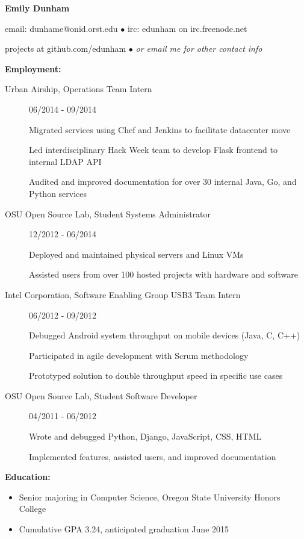 \documentclass[11pt]{article}
\begin{document}
\centerline{{\LARGE \bf Emily Dunham}}

\bigskip

\centerline{email: dunhame@onid.orst.edu
        $\bullet$
        irc: edunham on irc.freenode.net}
\centerline{projects at github.com/edunham
        $\bullet$
        \emph{or email me for other contact info}}

\bigskip
\hrulefill
\bigskip

{\Large \bf Employment:}
\begin{description}
\item[Urban Airship, Operations Team Intern]
    \hfill 06/2014 - 09/2014
    
    Migrated services using Chef and Jenkins to facilitate datacenter move

    Led interdisciplinary Hack Week team to develop Flask frontend to internal LDAP API

    Audited and improved documentation for over 30 internal Java, Go, and Python
    services

\item[OSU Open Source Lab, Student Systems Administrator]
    \hfill 12/2012 - 06/2014

    Deployed and maintained physical servers and Linux VMs

    Assisted users from over 100 hosted projects with hardware and software

\item[Intel Corporation, Software Enabling Group USB3 Team Intern]
    \hfill 06/2012 - 09/2012

    Debugged Android system throughput on mobile devices (Java, C, C++)

    Participated in agile development with Scrum methodology

    Prototyped solution to double throughput speed in specific use cases

\item[OSU Open Source Lab, Student Software Developer]
    \hfill 04/2011 - 06/2012

    Wrote and debugged Python, Django, JavaScript, CSS, HTML

    Implemented features, assisted users, and improved documentation
\end{description}

\smallskip
\hrulefill
\bigskip

{\Large \bf Education:}
\begin{itemize}
    \setlength{\itemsep}{1pt}
    \setlength{\parskip}{0pt}
    \setlength{\parsep}{0pt}

    \item Senior majoring in Computer Science, Oregon State University
          Honors College
    \item Cumulative GPA 3.24, anticipated graduation June 2015

\end{itemize}
\end{document}
